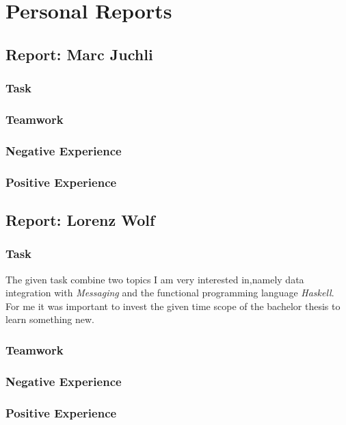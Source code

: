 \chapter{Personal Reports}

\section*{Report: Marc Juchli}

\subsection*{Task}
\subsection*{Teamwork}
\subsection*{Negative Experience}
\subsection*{Positive Experience}


\section*{Report: Lorenz Wolf}

\subsection*{Task}
The given task combine two topics I am very interested in,namely data
integration with \textit{Messaging} and the functional programming language
\textit{Haskell}. For me it was important to invest the given time scope of the
bachelor thesis to learn something new.

\subsection*{Teamwork}
\subsection*{Negative Experience}
\subsection*{Positive Experience}


